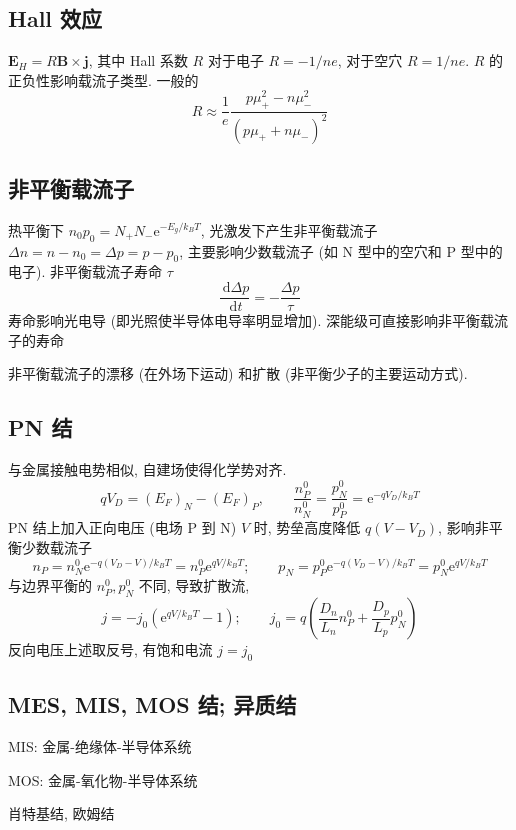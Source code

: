 \documentclass[11pt,a4paper]{article}%
\numberwithin{equation}{section}%
\renewcommand*{\vec}[1]{\bm{#1}}%
\newcommand{\dif}{\,\mathrm d}
\newcommand\e{\mathrm{e}}%
\begin{document}
\subsection{Hall 效应} %
\label{sub:hall}
$\vec E_H = R\vec B\times\vec j$, 其中 Hall 系数 $R$ 对于电子 $R = - 1/ne$, 对于空穴 $R = 1/ne$. $R$ 的正负性影响载流子类型. 一般的
\begin{equation}
	R\approx\frac 1e\frac{p\mu_+^2 - n\mu_-^2}{(p\mu_+ + n\mu_-)^2}
\end{equation}
\subsection{非平衡载流子} %
\label{sub:non_equi_e}
热平衡下 $n_0p_0 = N_+N_-\e^{-E_g/k_BT}$, 光激发下产生非平衡载流子 $\Delta n = n-n_0 = \Delta p = p-p_0$, 主要影响少数载流子 (如 N 型中的空穴和 P 型中的电子). 非平衡载流子寿命 $\tau$
\begin{equation}
	\frac{\dif\Delta p}{\dif t} = -\frac{\Delta p}{\tau}
\end{equation}
寿命影响光电导 (即光照使半导体电导率明显增加). 深能级可直接影响非平衡载流子的寿命

非平衡载流子的漂移 (在外场下运动) 和扩散 (非平衡少子的主要运动方式).
\subsection{PN 结} %
\label{sub:pn_junc}
与金属接触电势相似, 自建场使得化学势对齐. 
\begin{equation}
	qV_D = (E_F)_N - (E_F)_P,\qquad 
	\frac{n_P^0}{n_N^0 } = \frac{p_N^0}{p_P^0} = \e^{-q V_D/k_B T}
\end{equation}
PN 结上加入正向电压 (电场 P 到 N) $V$ 时, 势垒高度降低 $q( V-V_D)$, 影响非平衡少数载流子
\begin{equation}
	n_P = n_N^0\e^{-q(V_D - V)/k_BT} = n_P^0\e^{qV/k_B T};\qquad
	p_N = p_P^0\e^{-q(V_D - V)/k_BT} = p_N^0\e^{qV/k_B T}
\end{equation}
与边界平衡的 $n_P^0, p_N^0$ 不同, 导致扩散流, 
\begin{equation}
	j = -j_0\left(\e^{qV/k_BT} - 1\right); \qquad
	j_0 = q\left(\frac{D_n}{L_n}n_P^0 + \frac{D_p}{L_p}p_N^0\right)
\end{equation}
反向电压上述取反号, 有饱和电流 $j = j_0$
\subsection{MES, MIS, MOS 结; 异质结} %
\label{sub:mes_mis_mos}
MIS: 金属-绝缘体-半导体系统

MOS: 金属-氧化物-半导体系统

肖特基结, 欧姆结
\end{document}
